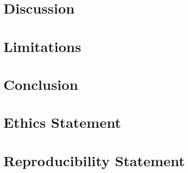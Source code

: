 \documentclass[10pt]{article}
\begin{document}
\section{Discussion}

\section{Limitations}

\section{Conclusion}

\section*{Ethics Statement}
\section*{Reproducibility Statement}

% 

\end{document}
